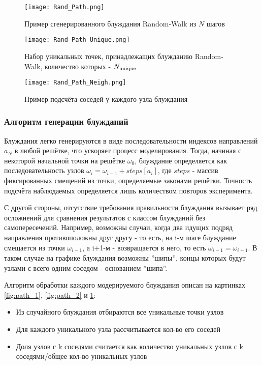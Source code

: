 \begin{figure}[h]
    
\begin{minipage}{0.49\textwidth}
    \texttt{[image: Rand\_Path.png]}
    \caption{Пример сгенерированного блуждания Random-Walk из $N$ шагов}
    \label{fig:path_1}
\end{minipage}
\hfill
\begin{minipage}{0.49\textwidth}
    \texttt{[image: Rand\_Path\_Unique.png]}
    \caption{Набор уникальных точек, принадлежащих блужданию Random-Walk, количество которых - $N_{\textup{unique}}$}
    \label{fig:path_2}
\end{minipage}
\centering
\texttt{[image: Rand\_Path\_Neigh.png]}
\caption{Пример подсчёта соседей у каждого узла блуждания}
\label{fig:path_3}
\end{figure}

\subsubsection{Алгоритм генерации блужданий}

Блуждания легко генерируются в виде последовательности индексов направлений $ {a_{N}} $ в любой решётке, что ускоряет процесс моделирования. 
Тогда, начиная с некоторой начальной точки на решётке $\omega_{0}$, блуждание определяется как последовательность узлов $ 
\omega_{i} = \omega_{i-1} + steps\left[a_{i}\right] $, где $steps$ - массив фиксированных смещений из точки, определяемые законами решётки. 
Точность подсчёта наблюдаемых определяется лишь количеством повторов эксперимента.

С другой стороны, отсутствие требования правильности блуждания вызывает ряд осложнений для сравнения результатов с классом блужданий без самопересечений. 
Например, возможны случаи, когда два идущих подряд направления противоположны друг другу - то есть, на i-м шаге блуждание смещается из точки $\omega_{i-1}$, а i+1-м - возвращается в него, то есть $\omega_{i-1} = \omega_{i+1}$.
В таком случае на графике блуждания возможны ''шипы'', концы которых будут узлами с всего одним соседом - основанием ''шипа''. 



Алгоритм обработки каждого модерируемого блуждания описан на картинках \ref{fig:path_1}, \ref{fig:path_2} и \ref{fig:path_3}:
\begin{itemize}
    \item Из случайного блуждания отбираются все уникальные точки узлов
    \item Для каждого уникального узла рассчитывается кол-во его соседей 
    \item Доля узлов с k соседями считается как {количество уникальных узлов с k соседями}/{общее кол-во уникальных узлов}
\end{itemize}

